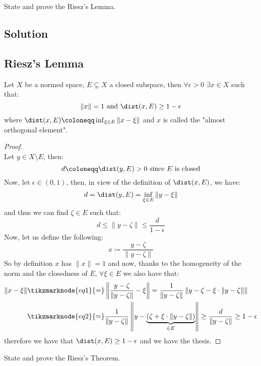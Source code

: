 
\question
State and prove the Riesz's Lemma.

\subsection*{Solution}

\subsection{Riesz's Lemma}
Let $X$ be a normed space, $E \subsetneq X$ a closed subspace, then $\forall \epsilon > 0$ $\exists x \in X$ such that:
\[ \| x \| =1 \text{ and } \dist(x,E) \geq 1 - \epsilon \] 
where $\dist(x,E) \coloneqq \inf_{\xi \in E} \|x - \xi \|$ and $x$ is called the "almost orthogonal element".

\begin{proof}
    \hspace*{\fill}\\ %
    Let $y \in X \setminus E$, then:
    \[ d \coloneqq \dist(y,E) > 0 \text{ since } E \text{ is closed} \]
    Now, let $\epsilon \in (0,1)$, then, in view of the definition of $\dist(x,E)$, we have:
    \[ d = \dist(y,E) = \inf_{\xi \in E} \|y - \xi \| \]
    and thus we can find $\zeta \in E$ such that:
    \[ d \leq \| y - \zeta \| \leq \frac{d}{1- \epsilon} \]
    Now, let us define the following:
    \[ x \coloneqq \frac{y-\zeta}{ \| y-\zeta \| } \]
    So by definition $x$ has $\|x\|=1$ and now, thanks to the homogeneity of the norm and the closedness of $E$, $\forall \xi \in E$ we also have that:
    \begin{align*}
        \| x - \xi\| & \tikzmarknode{eq1}{=} \left\| \frac{y-\zeta}{ \| y-\zeta \| } - \xi \right\| = \frac{1}{ \| y-\zeta \| } \left\| y-\zeta - \xi \cdot \| y-\zeta \| \right\| \\
        & \tikzmarknode{eq2}{=} \frac{1}{ \| y-\zeta \| } \left\| y - \underbrace{(\zeta + \xi \cdot \| y-\zeta \| )}_{\in E} \right\| \geq \frac{d}{\| y-\zeta \|} \geq 1 - \epsilon
    \end{align*}
    therefore we have that $\dist(x,E) \geq 1 - \epsilon$ and we have the thesis.
\end{proof}


\question
State and prove the Riesz's Theorem.

